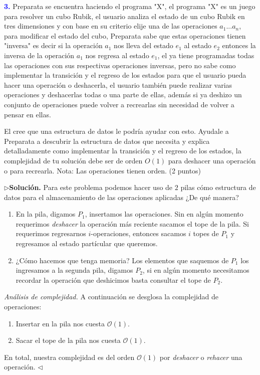 \textbf{\textcolor{blue}{3.}} Preparata se encuentra haciendo el programa "X", el programa "X" es un juego para resolver un cubo Rubik, el usuario analiza el estado de  un cubo Rubik en tres dimensiones y con base en su criterio  elije una de las operaciones $a_1 ... a_n$, para modificar el estado del cubo, Preparata sabe que estas operaciones tienen "inversa" es decir si la operación $a_1$ nos lleva del estado $e_1$ al estado $e_2$ entonces la inversa de la operación $a_1$ nos regresa al estado $e_1$, el ya tiene programadas todas las operaciones con sus respectivas operaciones inversas, pero no sabe como implementar la transición y el regreso de los estados para que el usuario pueda hacer una operación o deshacerla, el usuario también puede realizar varias operaciones y deshacerlas todas o una parte de ellas, además si ya deshizo un conjunto de operaciones puede volver a recrearlas sin necesidad de volver a pensar en ellas.
    
El cree que una estructura de datos le podría ayudar con esto. Ayudale a Preparata a descubrir la estructura de datos que necesita y explica detalladamente como  implementar la transición y el regreso de los estados, la complejidad de tu solución debe ser de orden $O(1)$ para deshacer una operación o para recrearla. Nota: Las operaciones tienen orden. (2 puntos)\newline

$\rhd$\textbf{Solución.} Para este problema podemos hacer uso de $2$ pilas cómo estructura
de datos para el almacenamiento de las operaciones aplicadas ¿De qué manera?
\begin{enumerate}
\item En la pila, digamos $P_1$, insertamos las operaciones. Sin en algún momento requerimos
  \textit{deshacer} la operación más reciente sacamos el tope de la pila. Si requerimos regresarnos
  $i$-operaciones, entonces sacamos $i$ topes de $P_1$ y regresamos al estado partícular que
  queremos.
\item ¿Cómo hacemos que tenga memoria? Los elementos que saquemos de $P_1$ los ingresamos a la
  segunda pila, digamos $P_2$, si en algún momento necesitamos recordar la operación que deshicimos
  basta consultar el tope de $P_2$.
\end{enumerate}
\textit{Análisis de complejidad.} A continuación se desglosa la complejidad de operaciones:
\begin{enumerate}
\item Insertar en la pila nos cuesta $\mathcal{O}(1)$.
\item Sacar el tope de la pila nos cuesta $\mathcal{O}(1)$.
\end{enumerate}
En total, nuestra complejidad es del orden $\mathcal{O}(1)$ por \textit{deshacer} o \textit{rehacer}
una operación.
\hfill $\lhd$
